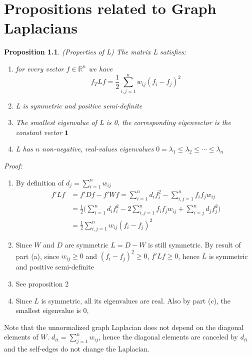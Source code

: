 \documentclass[10pt,a4paper, nocenter]{report}
\newtheorem{prop}{Proposition}
\begin{document}
    \appendix
    \chapter{Propositions related to Graph Laplacians}
    \begin{prop}(Properties of L) The matrix L satisfies:
        \begin{enumerate}
            \item for every vector $f \in \mathbb{R}^{n}$ we have $$ f_{T}Lf = \frac{1}{2}\sum_{i,j=1}^{n} w_{ij}(f_{i}-f_{j})^{2} $$
            \item L is symmetric and positive semi-definite
            \item The smallest eigenvalue of L is 0, the corresponding eigenvector is the constant vector $\mathbf{1}$
            \item L has $n$ non-negative, real-values eigenvalues $0=\lambda_{1} \le \lambda_{2} \le \cdots \le \lambda_{n}$
        \end{enumerate}
    \end{prop}
    \textit{Proof:}
    \begin{enumerate}
        \item  By definition of $d_{j} = \sum_{i=1}^{n}w_{ij}$
        \begin{align*}
        f'Lf & = f'Df - f'Wf = \sum_{i=1}^{n}d_{i}f_{i}^{2} -  \sum_{i,j=1}^{n}f_{i}f_{j}w_{ij}\\
        & = \frac{1}{2}\bigg(\sum_{i=1}^{n}d_{i}f_{i}^{2} -  2\sum_{i,j=1}^{n}f_{i}f_{j}w_{ij} + \sum_{i=j}^{n}d_{j}f_{j}^{2}\bigg)\\
        & = \frac{1}{2}\sum_{i,j=1}^{n}w_{ij}(f_{i}-f_{j})^{2}
        \end{align*}
        \item Since $W$ and $D$ are symmetric $L = D-W$ is still symmetric. By result of part (a), since $w_{ij} \ge 0$ and $(f_{i}-f_{j})^{2} \ge 0$, $f'Lf \ge 0$, hence $L$ is symmetric and positive semi-definite
        \item See proposition 2
        \item Since $L$ is symmetric, all its eigenvalues are real. Also by part (c), the smallest eigenvalue is 0, 
    \end{enumerate}

    Note that the unnormalized graph Laplacian does not depend on the diagonal elements of $W$. $d_{ii} = \sum_{j=1}^{n}w_{ij}$, hence the diagonal elements are canceled by $d_{ii}$ and the self-edges do not change the Laplacian. \\
    
\end{document}
